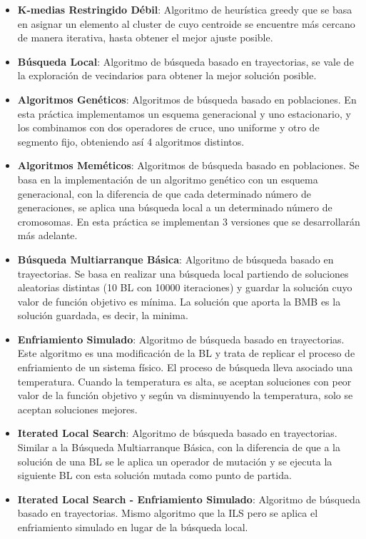 \begin{itemize}
   \item \textbf{K-medias Restringido Débil}: Algoritmo de heurística greedy que se basa en asignar un elemento al cluster de cuyo centroide se encuentre más cercano de manera iterativa, hasta obtener el mejor ajuste posible.
   \item \textbf{Búsqueda Local}: Algoritmo de búsqueda basado en trayectorias, se vale de la exploración de vecindarios para obtener la mejor solución posible.
   \item \textbf{Algoritmos Genéticos}: Algoritmos de búsqueda basado en poblaciones. En esta práctica implementamos un esquema generacional y uno estacionario, y los combinamos con dos operadores de cruce, uno uniforme y otro de segmento fijo, obteniendo así 4 algoritmos distintos.
   \item \textbf{Algoritmos Meméticos}: Algoritmos de búsqueda basado en poblaciones. Se basa en la implementación de un algoritmo genético con un esquema generacional, con la diferencia de que cada determinado número de generaciones, se aplica una búsqueda local a un determinado número de cromosomas. En esta práctica se implementan 3 versiones que se desarrollarán más adelante.
   \item \textbf{Búsqueda Multiarranque Básica}: Algoritmo de búsqueda basado en trayectorias. Se basa en realizar una búsqueda local partiendo de soluciones aleatorias distintas (10 BL con 10000 iteraciones) y guardar la solución cuyo valor de función objetivo es mínima. La solución que aporta la BMB es la solución guardada, es decir, la minima.
   \item \textbf{Enfriamiento Simulado}: Algoritmo de búsqueda basado en trayectorias. Este algoritmo es una modificación de la BL y trata de replicar el proceso de enfriamiento de un sistema físico. El proceso de búsqueda lleva asociado una temperatura. Cuando la temperatura es alta, se aceptan soluciones con peor valor de la función objetivo y según va disminuyendo la temperatura, solo se aceptan soluciones mejores.
   \item \textbf{Iterated Local Search}: Algoritmo de búsqueda basado en trayectorias. Similar a la Búsqueda Multiarranque Básica, con la diferencia de que a la solución de una BL se le aplica un operador de mutación y se ejecuta la siguiente BL con esta solución mutada como punto de partida.
   \item \textbf{Iterated Local Search - Enfriamiento Simulado}: Algoritmo de búsqueda basado en trayectorias. Mismo algoritmo que la ILS pero se aplica el enfriamiento simulado en lugar de la búsqueda local.

\end{itemize}
\newpage
